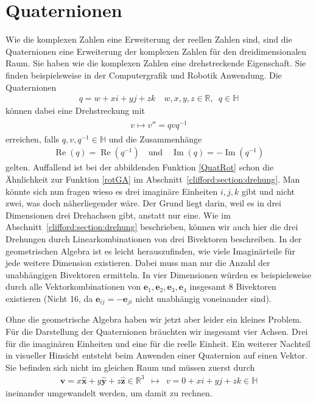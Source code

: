 %
%
%
\section{Quaternionen}

Wie die komplexen Zahlen eine Erweiterung der reellen Zahlen sind, sind die Quaternionen eine Erweiterung der komplexen Zahlen für den dreidimensionalen Raum.
Sie haben wie die komplexen Zahlen eine drehstreckende Eigenschaft.
Sie finden beispielsweise in der Computergrafik und Robotik Anwendung.
Die Quaternionen
\begin{align*}
q = w + xi + yj + zk \quad w,x,y,z \in \mathbb{R},\enspace q \in \mathbb{H}
\end{align*}
können dabei eine Drehstreckung mit
\begin{align} \label{QuatRot}
\begin{split} 
v \mapsto v'' = qvq^{-1}
\end{split}
\end{align}
erreichen, falls $q,v,q^{-1} \in \mathbb{H}$ und die Zusammenhänge
\begin{align*}
\operatorname{Re}(q) = \operatorname{Re}(q^{-1})\quad\text{und}\quad \operatorname{Im}(q) = -\operatorname{Im}(q^{-1})
\end{align*}
gelten.
Auffallend ist bei der abbildenden Funktion \eqref{QuatRot} schon die Ähnlichkeit zur Funktion \eqref{rotGA} im Abschnitt~\ref{clifford:section:drehung}.
Man könnte sich nun fragen wieso es drei imaginäre Einheiten $i,j,k$ gibt und nicht zwei, was doch näherliegender wäre.
Der Grund liegt darin, weil es in drei Dimensionen drei Drehachsen gibt, anstatt nur eine.
Wie im Abschnitt~\ref{clifford:section:drehung} beschrieben, können wir auch hier die drei Drehungen durch Linearkombinationen von drei Bivektoren beschreiben.
In der geometrischen Algebra ist es leicht herauszufinden, wie viele Imaginärteile für jede weitere Dimension existieren.
Dabei muss man nur die Anzahl der unabhängigen Bivektoren ermitteln.
In vier Dimensionen würden es beispielsweise durch alle Vektorkombinationen von $\mathbf{e}_1, \mathbf{e}_2,\mathbf{e}_3, \mathbf{e}_4$ insgesamt 8 Bivektoren existieren (Nicht 16, da $\mathbf{e}_{i\!j} = -\mathbf{e}_{ji}$ nicht unabhängig voneinander sind).

Ohne die geometrische Algebra haben wir jetzt aber leider ein kleines Problem.
Für die Darstellung der Quaternionen bräuchten wir insgesamt vier Achsen.
Drei für die imaginären Einheiten und eine für die reelle Einheit.
Ein weiterer Nachteil in visueller Hinsicht entsteht beim Anwenden einer Quaternion auf einen Vektor.
Sie befinden sich nicht im gleichen Raum und müssen zuerst durch
\begin{align}
\mathbf{v} = x\mathbf{\hat{x}} + y\mathbf{\hat{y}} + z \mathbf{\hat{z}} \in \mathbb{R}^3 \enspace\mapsto\enspace v = 0 + xi + yj + zk \in \mathbb{H}
\end{align}
ineinander umgewandelt werden, um damit zu rechnen.

